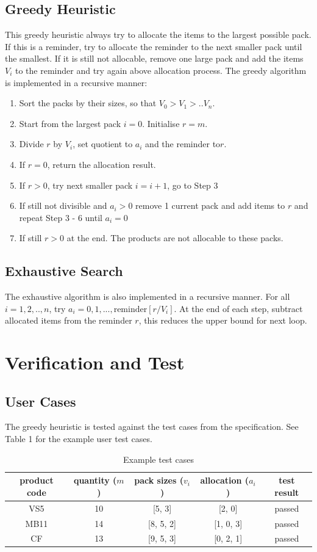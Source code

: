 \documentclass[a4paper]{article}
\begin{document}
\subsection{Greedy Heuristic}
This greedy heuristic always try to allocate the items to the largest possible pack. If this is a reminder, try to allocate the reminder to the next smaller pack until the smallest. If it is still not allocable, remove one large pack and add the items $V_i$ to the reminder and try again above allocation process. The greedy algorithm is implemented in a recursive manner:
\begin{enumerate}
\item Sort the packs by their sizes, so that $V_0 > V_1 > .. V_n$.
\item Start from the largest pack $i=0$. Initialise $r=m$.
\item Divide $r$ by $V_i$, set quotient to $a_i$ and the reminder to$r$.
\item If $r = 0$, return the allocation result.
\item If $r > 0$, try next smaller pack $i = i + 1$, go to Step 3
\item If still not divisible and $a_i>0$ remove 1 current pack and add items to $r$ and repeat Step 3 - 6 until $a_i = 0$
\item If still $r>0$ at the end. The products are not allocable to these packs.
\end{enumerate}


\subsection{Exhaustive Search}
The exhaustive algorithm is also implemented in a recursive manner. For all $i=1, 2, .., n$, try $a_i = 0, 1, ...,\mathrm{reminder}[r/V_i]$. At the end of each step, subtract allocated items from the reminder $r$, this reduces the upper bound for next loop.

\section{Verification and Test} 
 
\subsection{User Cases}
The greedy heuristic is tested against the test cases from the specification. See Table 1 for the example user test cases.
\begin{table}
\label{tab:example-test}
 \caption{Example test cases}
 \centering
 \begin{tabular}{| c | c | c | c | c |}
 \hline
        product code & quantity ($m$) & pack sizes ($v_i$) & allocation ($a_i$) & test result\\
 \hline
 		VS5 & 10 & [5, 3] & [2, 0] & passed \\
 		MB11 & 14 & [8, 5, 2] & [1, 0, 3] & passed\\
 		CF & 13 & [9, 5, 3] & [0, 2, 1] & passed\\
  \hline
 \end{tabular}
\end{table}
\end{document}
